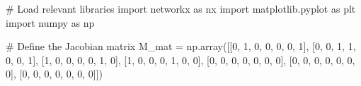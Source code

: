 \documentclass[
  letterpaper,
  DIV=11,
  numbers=noendperiod]{scrreprt}
\newenvironment{Shaded}{\begin{snugshade}}{\end{snugshade}}
\newcommand{\CommentTok}[1]{\textcolor[rgb]{0.37,0.37,0.37}{#1}}
\newcommand{\DecValTok}[1]{\textcolor[rgb]{0.68,0.00,0.00}{#1}}
\newcommand{\ImportTok}[1]{\textcolor[rgb]{0.00,0.46,0.62}{#1}}
\newcommand{\NormalTok}[1]{\textcolor[rgb]{0.00,0.23,0.31}{#1}}
\newcommand{\OperatorTok}[1]{\textcolor[rgb]{0.37,0.37,0.37}{#1}}
\begin{document}
\begin{tcolorbox}[enhanced jigsaw, titlerule=0mm, breakable, bottomrule=.15mm, toprule=.15mm, colbacktitle=quarto-callout-note-color!10!white, rightrule=.15mm, toptitle=1mm, opacityback=0, left=2mm, coltitle=black, title=\textcolor{quarto-callout-note-color}{\faInfo}\hspace{0.5em}{Python code}, colframe=quarto-callout-note-color-frame, opacitybacktitle=0.6, leftrule=.75mm, bottomtitle=1mm, arc=.35mm, colback=white]

\begin{Shaded}
\begin{Highlighting}[]
\CommentTok{\# Load relevant libraries}
\ImportTok{import}\NormalTok{ networkx }\ImportTok{as}\NormalTok{ nx}
\ImportTok{import}\NormalTok{ matplotlib.pyplot }\ImportTok{as}\NormalTok{ plt}
\ImportTok{import}\NormalTok{ numpy }\ImportTok{as}\NormalTok{ np}


\CommentTok{\# Define the Jacobian matrix}
\NormalTok{M\_mat }\OperatorTok{=}\NormalTok{ np.array([[}\DecValTok{0}\NormalTok{, }\DecValTok{1}\NormalTok{, }\DecValTok{0}\NormalTok{, }\DecValTok{0}\NormalTok{, }\DecValTok{0}\NormalTok{, }\DecValTok{0}\NormalTok{, }\DecValTok{1}\NormalTok{],}
\NormalTok{                  [}\DecValTok{0}\NormalTok{, }\DecValTok{0}\NormalTok{, }\DecValTok{1}\NormalTok{, }\DecValTok{1}\NormalTok{, }\DecValTok{0}\NormalTok{, }\DecValTok{0}\NormalTok{, }\DecValTok{1}\NormalTok{],}
\NormalTok{                  [}\DecValTok{1}\NormalTok{, }\DecValTok{0}\NormalTok{, }\DecValTok{0}\NormalTok{, }\DecValTok{0}\NormalTok{, }\DecValTok{0}\NormalTok{, }\DecValTok{1}\NormalTok{, }\DecValTok{0}\NormalTok{],}
\NormalTok{                  [}\DecValTok{1}\NormalTok{, }\DecValTok{0}\NormalTok{, }\DecValTok{0}\NormalTok{, }\DecValTok{0}\NormalTok{, }\DecValTok{1}\NormalTok{, }\DecValTok{0}\NormalTok{, }\DecValTok{0}\NormalTok{],}
\NormalTok{                  [}\DecValTok{0}\NormalTok{, }\DecValTok{0}\NormalTok{, }\DecValTok{0}\NormalTok{, }\DecValTok{0}\NormalTok{, }\DecValTok{0}\NormalTok{, }\DecValTok{0}\NormalTok{, }\DecValTok{0}\NormalTok{],}
\NormalTok{                  [}\DecValTok{0}\NormalTok{, }\DecValTok{0}\NormalTok{, }\DecValTok{0}\NormalTok{, }\DecValTok{0}\NormalTok{, }\DecValTok{0}\NormalTok{, }\DecValTok{0}\NormalTok{, }\DecValTok{0}\NormalTok{],}
\NormalTok{                  [}\DecValTok{0}\NormalTok{, }\DecValTok{0}\NormalTok{, }\DecValTok{0}\NormalTok{, }\DecValTok{0}\NormalTok{, }\DecValTok{0}\NormalTok{, }\DecValTok{0}\NormalTok{, }\DecValTok{0}\NormalTok{]])}


\end{Highlighting}
\end{Shaded}
\end{tcolorbox}
\end{document}
